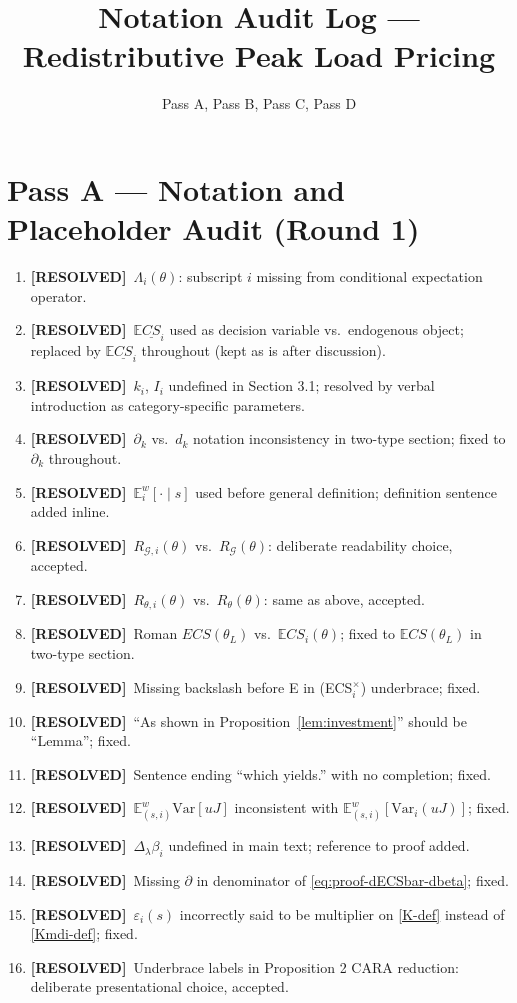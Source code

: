\documentclass{class}
\title{Notation Audit Log --- Redistributive Peak Load Pricing}
\author{Pass A, Pass B, Pass C, Pass D}
\date{}
\newcommand{\ok}{\textcolor{ok}{\textbf{[RESOLVED]}}}
\begin{document}
\maketitle

\section*{Pass A --- Notation and Placeholder Audit (Round 1)}

\begin{enumerate}[leftmargin=1.5cm]
\item \ok\ $\Lambda_i(\theta)$: subscript $i$ missing from conditional expectation operator.
\item \ok\ $\mathbb{E}\underline{CS}_i$ used as decision variable vs.\ endogenous object; replaced by $\mathbb{E}\underline{CS}_i$ throughout (kept as is after discussion).
\item \ok\ $k_i$, $I_i$ undefined in Section 3.1; resolved by verbal introduction as category-specific parameters.
\item \ok\ $\partial_k$ vs.\ $d_k$ notation inconsistency in two-type section; fixed to $\partial_k$ throughout.
\item \ok\ $\mathbb{E}_i^w[\cdot\mid s]$ used before general definition; definition sentence added inline.
\item \ok\ $R_{\mathcal{G},i}(\theta)$ vs.\ $R_\mathcal{G}(\theta)$: deliberate readability choice, accepted.
\item \ok\ $R_{\theta,i}(\theta)$ vs.\ $R_\theta(\theta)$: same as above, accepted.
\item \ok\ Roman $ECS(\theta_L)$ vs.\ $\mathbb{E}CS_i(\theta)$; fixed to $\mathbb{E}CS(\theta_L)$ in two-type section.
\item \ok\ Missing backslash before E in (ECS$_i^\times$) underbrace; fixed.
\item \ok\ ``As shown in Proposition~\ref{lem:investment}'' should be ``Lemma''; fixed.
\item \ok\ Sentence ending ``which yields.'' with no completion; fixed.
\item \ok\ $\mathbb{E}_{(s,i)}^w\mathrm{Var}[uJ]$ inconsistent with $\mathbb{E}_{(s,i)}^w[\mathrm{Var}_i(uJ)]$; fixed.
\item \ok\ $\Delta_\lambda\beta_i$ undefined in main text; reference to proof added.
\item \ok\ Missing $\partial$ in denominator of \eqref{eq:proof-dECSbar-dbeta}; fixed.
\item \ok\ $\varepsilon_i(s)$ incorrectly said to be multiplier on \eqref{K-def} instead of \eqref{Kmdi-def}; fixed.
\item \ok\ Underbrace labels in Proposition 2 CARA reduction: deliberate presentational choice, accepted.
\end{enumerate}
\end{document}
